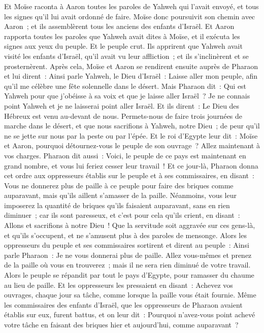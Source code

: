 \begin{multicols}{2}
Et Moïse raconta à Aaron toutes les paroles de Yahweh qui l'avait envoyé, et tous les signes qu'il lui avait ordonné de faire.
Moïse donc poursuivit son chemin avec Aaron~; et ils assemblèrent tous les anciens des enfants d'Israël.
Et Aaron rapporta toutes les paroles que Yahweh avait dites à Moïse, et il exécuta les signes aux yeux du peuple.
Et le peuple crut. Ils apprirent que Yahweh avait visité les enfants d'Israël, qu'il avait vu leur affliction~; et ils s'inclinèrent et se prosternèrent.
\VerseOne{}Après cela, Moïse et Aaron se rendirent ensuite auprès de Pharaon et lui dirent~: Ainsi parle Yahweh, le Dieu d'Israël~: Laisse aller mon peuple, afin qu'il me célèbre une fête solennelle dans le désert.
Mais Pharaon dit~: Qui est Yahweh pour que j'obéisse à sa voix et que je laisse aller Israël~? Je ne connais point Yahweh et je ne laisserai point aller Israël.
Et ils dirent~: Le Dieu des Hébreux est venu au-devant de nous. Permets-nous de faire trois journées de marche dans le désert, et que nous sacrifions à Yahweh, notre Dieu~; de peur qu'il ne se jette sur nous par la peste ou par l'épée.
Et le roi d'Egypte leur dit~: Moïse et Aaron, pourquoi détournez-vous le peuple de son ouvrage~? Allez maintenant à vos charges.
Pharaon dit aussi~: Voici, le peuple de ce pays est maintenant en grand nombre, et vous lui feriez cesser leur travail~!
Et ce jour-là, Pharaon donna cet ordre aux oppresseurs établis sur le peuple et à ses commissaires, en disant~:
Vous ne donnerez plus de paille à ce peuple pour faire des briques comme auparavant, mais qu'ils aillent s'amasser de la paille.
Néanmoins, vous leur imposerez la quantité de briques qu'ils faisaient auparavant, sans en rien diminuer~; car ils sont paresseux, et c'est pour cela qu'ils crient, en disant~: Allons et sacrifions à notre Dieu~!
Que la servitude soit aggravée sur ces gens-là, et qu'ils s'occupent, et ne s'amusent plus à des paroles de mensonge.
Alors les oppresseurs du peuple et ses commissaires sortirent et dirent au peuple~: Ainsi parle Pharaon~: Je ne vous donnerai plus de paille.
Allez vous-mêmes et prenez de la paille où vous en trouverez~; mais il ne sera rien diminué de votre travail.
Alors le peuple se répandit par tout le pays d'Egypte, pour ramasser du chaume au lieu de paille.
Et les oppresseurs les pressaient en disant~: Achevez vos ouvrages, chaque jour sa tâche, comme lorsque la paille vous était fournie.
Même les commissaires des enfants d'Israël, que les oppresseurs de Pharaon avaient établis sur eux, furent battus, et on leur dit~: Pourquoi n'avez-vous point achevé votre tâche en faisant des briques hier et aujourd'hui, comme auparavant~?

\end{multicols}
